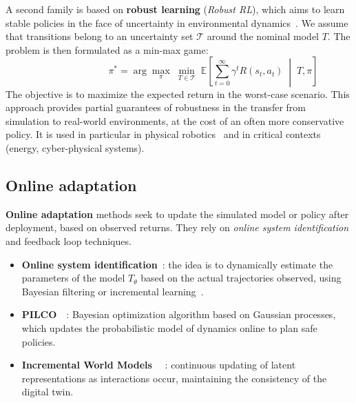         \noindent
        A second family is based on \textbf{robust learning}
        (\textit{Robust RL}), which aims to learn stable policies
        in the face of uncertainty in environmental dynamics~\cite{pinto2017robust}.
        We assume that transitions belong to an uncertainty set
        $\mathcal{T}$ around the nominal model $T$.
        The problem is then formulated as a min-max game:
        \[
          \hspace{3cm}\pi^* = \arg\max_\pi \; \min_{T \in \mathcal{T}}
          \; \mathbb{E}\!\left[\sum_{t=0}^\infty \gamma^t R(s_t,a_t) \;\middle|\; T, \pi\right]
        \]
        The objective is to maximize the expected return
        in the worst-case scenario.
        This approach provides partial guarantees of robustness
        in the transfer from simulation to real-world environments,
        at the cost of an often more conservative policy.
        It is used in particular in physical robotics~\cite{pinto2017robust}
        and in critical contexts (energy, cyber-physical systems).

        \subsection{Online adaptation}

        \noindent
        \textbf{Online adaptation} methods seek to
        update the simulated model or policy after deployment,
        based on observed returns.
        They rely on \textit{online system identification}
        and feedback loop techniques.

        \begin{itemize}
          \item \textbf{Online system identification}~: the idea is to dynamically estimate
                the parameters of the model $T_\theta$
                based on the actual trajectories observed,
                using Bayesian filtering or incremental learning~\cite{ljung1999system}.
          \item \textbf{PILCO}~\cite{deisenroth2011pilco}~: Bayesian optimization algorithm
                based on Gaussian processes,
                which updates the probabilistic model of dynamics online
                to plan safe policies.
          \item \textbf{Incremental World Models}~\cite{hafner2019learning} ~:
                continuous updating of latent representations
                as interactions occur,
                maintaining the consistency of the digital twin.
        \end{itemize}

